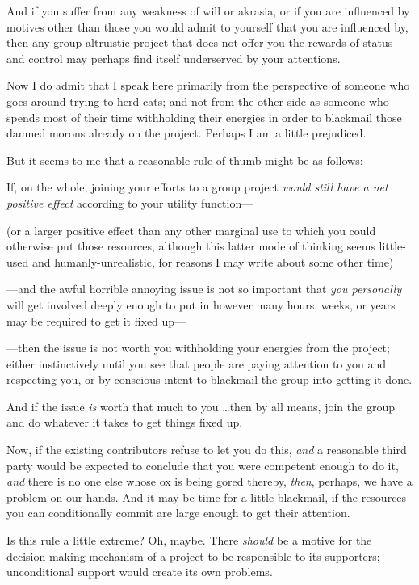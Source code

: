 {
 And if you suffer from any weakness of will or akrasia, or if you
are influenced by motives other than those you would admit to yourself
that you are influenced by, then any group-altruistic project that does
not offer you the rewards of status and control may perhaps find itself
underserved by your attentions.}

{
 Now I do admit that I speak here primarily from the perspective of
someone who goes around trying to herd cats; and not from the other
side as someone who spends most of their time withholding their
energies in order to blackmail those damned morons already on the
project. Perhaps I am a little prejudiced.}

{
 But it seems to me that a reasonable rule of thumb might be as
follows:}

{
 If, on the whole, joining your efforts to a group project
\textit{would still have a net positive effect} according to your
utility function---}

{
 (or a larger positive effect than any other marginal use to which
you could otherwise put those resources, although this latter mode of
thinking seems little-used and humanly-unrealistic, for reasons I may
write about some other time)}

{
 {}---and the awful horrible annoying issue is not so important
that \textit{you personally} will get involved deeply enough to put in
however many hours, weeks, or years may be required to get it fixed
up---}

{
 {}---then the issue is not worth you withholding your energies
from the project; either instinctively until you see that people are
paying attention to you and respecting you, or by conscious intent to
blackmail the group into getting it done.}

{
 And if the issue \textit{is} worth that much to you \ldots then by
all means, join the group and do whatever it takes to get things fixed
up.}

{
 Now, if the existing contributors refuse to let you do this,
\textit{and} a reasonable third party would be expected to conclude
that you were competent enough to do it, \textit{and} there is no one
else whose ox is being gored thereby, \textit{then}, perhaps, we have a
problem on our hands. And it may be time for a little blackmail, if the
resources you can conditionally commit are large enough to get their
attention.}

{
 Is this rule a little extreme? Oh, maybe. There \textit{should} be
a motive for the decision-making mechanism of a project to be
responsible to its supporters; unconditional support would create its
own problems.}

